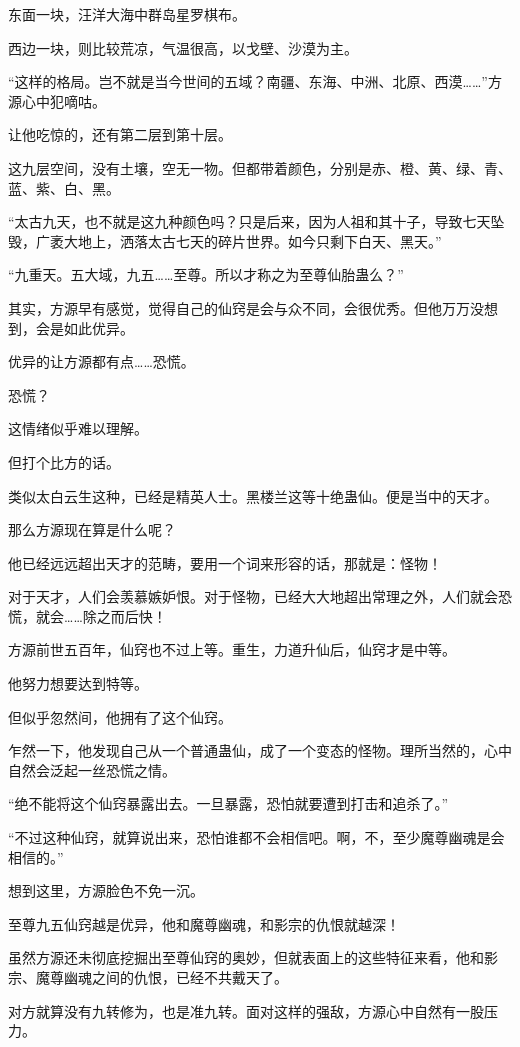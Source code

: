 \begin{this_body}
东面一块，汪洋大海中群岛星罗棋布。

西边一块，则比较荒凉，气温很高，以戈壁、沙漠为主。

“这样的格局。岂不就是当今世间的五域？南疆、东海、中洲、北原、西漠……”方源心中犯嘀咕。

让他吃惊的，还有第二层到第十层。

这九层空间，没有土壤，空无一物。但都带着颜色，分别是赤、橙、黄、绿、青、蓝、紫、白、黑。

“太古九天，也不就是这九种颜色吗？只是后来，因为人祖和其十子，导致七天坠毁，广袤大地上，洒落太古七天的碎片世界。如今只剩下白天、黑天。”

“九重天。五大域，九五……至尊。所以才称之为至尊仙胎蛊么？”

其实，方源早有感觉，觉得自己的仙窍是会与众不同，会很优秀。但他万万没想到，会是如此优异。

优异的让方源都有点……恐慌。

恐慌？

这情绪似乎难以理解。

但打个比方的话。

类似太白云生这种，已经是精英人士。黑楼兰这等十绝蛊仙。便是当中的天才。

那么方源现在算是什么呢？

他已经远远超出天才的范畴，要用一个词来形容的话，那就是：怪物！

对于天才，人们会羡慕嫉妒恨。对于怪物，已经大大地超出常理之外，人们就会恐慌，就会……除之而后快！

方源前世五百年，仙窍也不过上等。重生，力道升仙后，仙窍才是中等。

他努力想要达到特等。

但似乎忽然间，他拥有了这个仙窍。

乍然一下，他发现自己从一个普通蛊仙，成了一个变态的怪物。理所当然的，心中自然会泛起一丝恐慌之情。

“绝不能将这个仙窍暴露出去。一旦暴露，恐怕就要遭到打击和追杀了。”

“不过这种仙窍，就算说出来，恐怕谁都不会相信吧。啊，不，至少魔尊幽魂是会相信的。”

想到这里，方源脸色不免一沉。

至尊九五仙窍越是优异，他和魔尊幽魂，和影宗的仇恨就越深！

虽然方源还未彻底挖掘出至尊仙窍的奥妙，但就表面上的这些特征来看，他和影宗、魔尊幽魂之间的仇恨，已经不共戴天了。

对方就算没有九转修为，也是准九转。面对这样的强敌，方源心中自然有一股压力。


\end{this_body}
